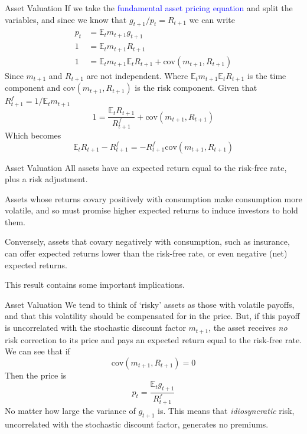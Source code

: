 \documentclass[aspectratio=169,xcolor=dvipsnames]{beamer}
\begin{document}
\begin{frame}{Asset Valuation}
    If we take the \textcolor{blue}{fundamental asset pricing equation} and split the variables, and since we know that $g_{t+1}/p_t = R_{t+1}$ we can write
    \begin{align*}
        p_t &= \mathbb{E}_t m_{t+1} g_{t+1} \\
        1 &= \mathbb{E}_t m_{t+1} R_{t+1} \\
        1 &= \mathbb{E}_t m_{t+1} \mathbb{E}_t R_{t+1} + \mathrm{cov}(m_{t+1}, R_{t+1})
    \end{align*}
    Since $m_{t+1}$ and $R_{t+1}$ are not independent. Where $\mathbb{E}_t m_{t+1} \mathbb{E}_t R_{t+1}$ is the time component and $\mathrm{cov}(m_{t+1}, R_{t+1})$ is the risk component. Given that $R^f_{t+1} = 1/\mathbb{E}_t m_{t+1}$
    \[
        1 = \frac{\mathbb{E}_t R_{t+1}}{R^f_{t+1}} + \mathrm{cov}(m_{t+1}, R_{t+1})
    \]
    Which becomes
    \[
        \mathbb{E}_t R_{t+1} - R^f_{t+1} = -R^f_{t+1} \mathrm{cov}(m_{t+1}, R_{t+1})
    \]
\end{frame}

\begin{frame}{Asset Valuation}
    All assets have an expected return equal to the risk-free rate, plus a risk adjustment.

    Assets whose returns covary positively with consumption make consumption more volatile, and so must promise higher expected returns to induce investors to hold them.

    Conversely, assets that covary negatively with consumption, such as insurance, can offer expected returns lower than the risk-free rate, or even negative (net) expected returns.

    This result contains some important implications.
\end{frame}

\begin{frame}{Asset Valuation}
    We tend to think of `risky' assets as those with volatile payoffs, and that this volatility should be compensated for in the price. But, if this payoff is uncorrelated with the stochastic discount factor $m_{t+1}$, the asset receives \emph{no} risk correction to its price and pays an expected return equal to the risk-free rate. We can see that if
    \[
        \mathrm{cov}(m_{t+1}, R_{t+1}) = 0
    \]
    Then the price is
    \[
        p_t = \frac{\mathbb{E}_t g_{t+1}}{R^f_{t+1}}
    \]
    No matter how large the variance of $g_{t+1}$ is. This means that \emph{idiosyncratic} risk, uncorrelated with the stochastic discount factor, generates no premiums.
\end{frame}
\end{document}
